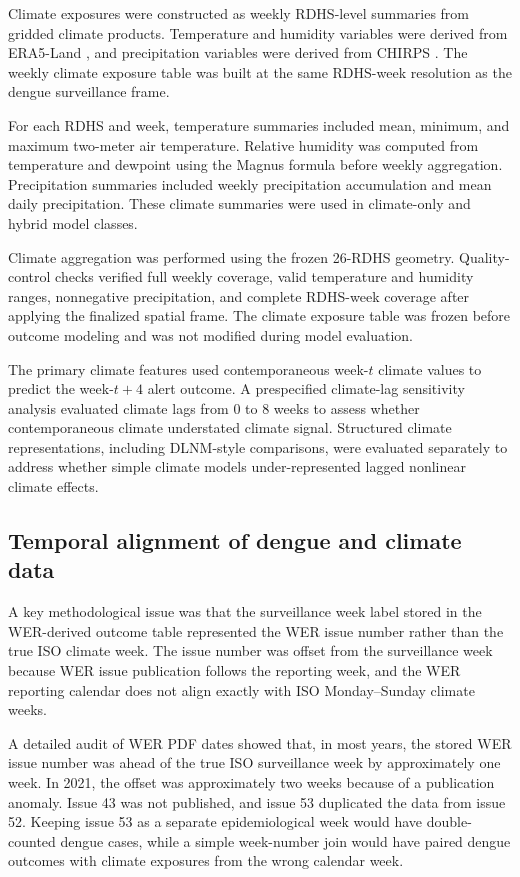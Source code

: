 \documentclass[11pt,a4paper]{article}
\begin{document}
Climate exposures were constructed as weekly RDHS-level summaries from gridded climate products. Temperature and humidity variables were derived from ERA5-Land
\citep{MunozSabater2021,ERA5LandCDS}, and precipitation variables were derived from
CHIRPS \citep{Funk2015,CHIRPS}. The weekly climate exposure table was built at the same RDHS-week resolution as the dengue surveillance frame.

For each RDHS and week, temperature summaries included mean, minimum, and maximum two-meter air temperature. Relative humidity was computed from temperature and dewpoint using the Magnus formula before weekly aggregation. Precipitation summaries included weekly precipitation accumulation and mean daily precipitation. These climate summaries were used in climate-only and hybrid model classes.

Climate aggregation was performed using the frozen 26-RDHS geometry. Quality-control checks verified full weekly coverage, valid temperature and humidity ranges, nonnegative precipitation, and complete RDHS-week coverage after applying the finalized spatial frame. The climate exposure table was frozen before outcome modeling and was not modified during model evaluation.

The primary climate features used contemporaneous week-$t$ climate values to predict the week-$t+4$ alert outcome. A prespecified climate-lag sensitivity analysis evaluated climate lags from 0 to 8 weeks to assess whether contemporaneous climate understated climate signal. Structured climate representations, including DLNM-style comparisons, were evaluated separately to address whether simple climate models under-represented lagged nonlinear climate effects.

\subsection{Temporal alignment of dengue and climate data}
\label{subsec:temporal-alignment}

A key methodological issue was that the surveillance week label stored in the WER-derived outcome table represented the WER issue number rather than the true ISO climate week. The issue number was offset from the surveillance week because WER issue publication follows the reporting week, and the WER reporting calendar does not align exactly with ISO Monday--Sunday climate weeks.

A detailed audit of WER PDF dates showed that, in most years, the stored WER issue number was ahead of the true ISO surveillance week by approximately one week. In 2021, the offset was approximately two weeks because of a publication anomaly. Issue 43 was not published, and issue 53 duplicated the data from issue 52. Keeping issue 53 as a separate epidemiological week would have double-counted dengue cases, while a simple week-number join would have paired dengue outcomes with climate exposures from the wrong calendar week.
\end{document}
